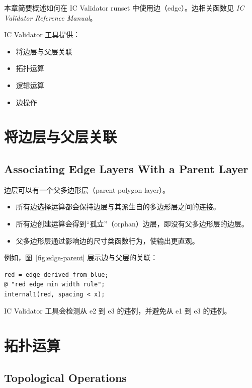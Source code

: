 \label{chap:edges}

本章简要概述如何在 IC Validator runset 中使用边（edge）。边相关函数见 \textit{IC Validator Reference Manual}。

IC Validator 工具提供：
\begin{itemize}
  \item 将边层与父层关联
  \item 拓扑运算
  \item 逻辑运算
  \item 边操作
\end{itemize}

\section{将边层与父层关联}
\subsection*{Associating Edge Layers With a Parent Layer}

边层可以有一个父多边形层（parent polygon layer）。
\begin{itemize}
  \item 所有边选择运算都会保持边层与其派生自的多边形层之间的连接。
  \item 所有边创建运算会得到“孤立”（orphan）边层，即没有父多边形层的边层。
  \item 父多边形层通过影响边的尺寸类函数行为，使输出更直观。
\end{itemize}
例如，图~\ref{fig:edge-parent} 展示边与父层的关联：
\begin{lstlisting}[style=pxl]
red = edge_derived_from_blue;
@ "red edge min width rule";
internal1(red, spacing < x);
\end{lstlisting}

IC Validator 工具会检测从 e2 到 e3 的违例，并避免从 e1 到 e3 的违例。


\section{拓扑运算}
\subsection*{Topological Operations}


